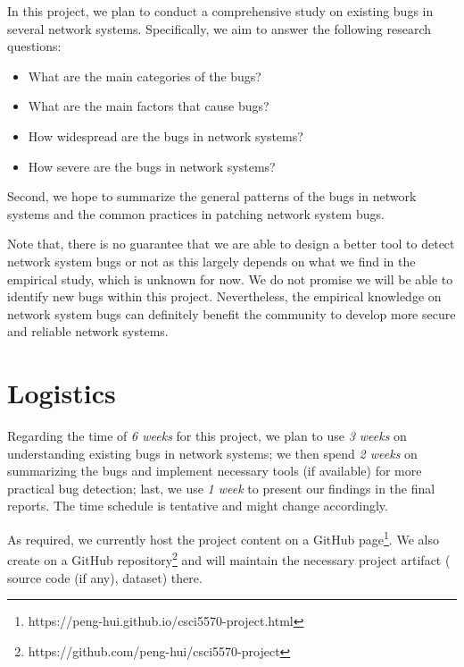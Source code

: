 In this project, we plan to conduct a comprehensive study on existing bugs in several network systems.
Specifically, we aim to answer the following research questions:
\begin{itemize}
\item What are the main categories of the bugs?
\item What are the main factors that cause bugs?
\item How widespread are the bugs in network systems?
\item How severe are the bugs in network systems?
\end{itemize}

Second, we hope to summarize the general patterns of the bugs in network systems and the common practices in patching network system bugs.

Note that, 
there is no guarantee that we are able to design a better tool to detect network system bugs or not as this largely depends on what we find in the empirical study, which is unknown for now.
We do not promise we will be able to identify new bugs within this project.
Nevertheless, the empirical knowledge on network system bugs can definitely benefit the community to develop more secure and reliable network systems.


\section{Logistics}
Regarding the time of \emph{6 weeks} for this project, we plan to use \emph{3 weeks} on understanding existing bugs in network systems; 
we then spend \emph{2 weeks} on summarizing the bugs and implement necessary tools (if available) for more practical bug detection;
last, we use \emph{1 week} to present our findings in the final reports.
The time schedule is tentative and might change accordingly.

As required, we currently host the project content on a GitHub page\footnote{https://peng-hui.github.io/csci5570-project.html}.
We also create on a GitHub repository\footnote{https://github.com/peng-hui/csci5570-project} and will maintain the necessary project artifact (\eg{} source code (if any), dataset) there.

